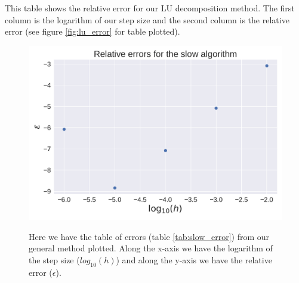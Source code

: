\documentclass[reprint, english,notitlepage]{revtex4-1}  %
\begin{document}

\begin{table}  %
  
  \caption{This table shows the relative error for our LU decomposition method. The first column is the logarithm of our step size and the second column is the relative error (see figure \ref{fig:lu_error} for table plotted).}
	\label{tab:lu_error}
\end{table}

\begin{figure}[h]
	\centering
	\includegraphics[scale=0.5]{../output/slow_errors.pdf}
	\label{fig:slow_error}
	\caption{Here we have the table of errors (table \ref{tab:slow_error}) from our general method plotted. Along the x-axis we have the logarithm of the step size ($log_{10}(h)$) and along the y-axis we have the relative error ($\epsilon$).}
\end{figure}
\end{document}
